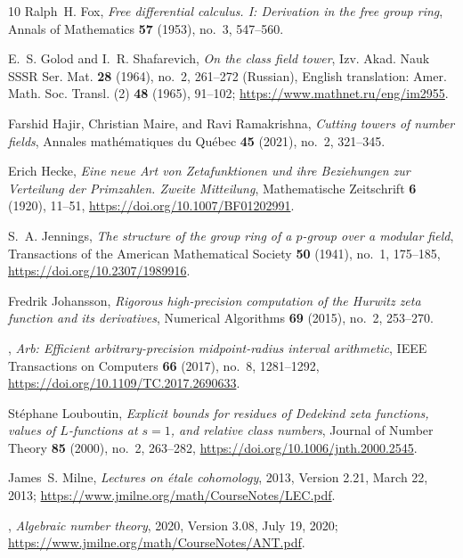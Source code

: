 \documentclass[11pt]{amsart}
\numberwithin{equation}{section}
\theoremstyle{definition}
\theoremstyle{remark}
\begin{document}
\begin{thebibliography}{10}
Ralph~H. Fox, \emph{Free differential calculus. {I}: Derivation in the free
  group ring}, Annals of Mathematics \textbf{57} (1953), no.~3, 547--560.

E.~S. Golod and I.~R. Shafarevich, \emph{On the class field tower}, Izv. Akad.
  Nauk SSSR Ser. Mat. \textbf{28} (1964), no.~2, 261--272 (Russian), English
  translation: Amer. Math. Soc. Transl. (2) \textbf{48} (1965), 91--102;
  \url{https://www.mathnet.ru/eng/im2955}.

Farshid Hajir, Christian Maire, and Ravi Ramakrishna, \emph{Cutting towers of
  number fields}, Annales math{\'e}matiques du Qu{\'e}bec \textbf{45} (2021),
  no.~2, 321--345.

Erich Hecke, \emph{Eine neue {Art} von {Zetafunktionen} und ihre {Beziehungen}
  zur {Verteilung} der {Primzahlen}. {Zweite Mitteilung}}, Mathematische
  Zeitschrift \textbf{6} (1920), 11--51,
  \url{https://doi.org/10.1007/BF01202991}.

S.~A. Jennings, \emph{The structure of the group ring of a {$p$}-group over a
  modular field}, Transactions of the American Mathematical Society \textbf{50}
  (1941), no.~1, 175--185, \url{https://doi.org/10.2307/1989916}.

Fredrik Johansson, \emph{Rigorous high-precision computation of the {Hurwitz}
  zeta function and its derivatives}, Numerical Algorithms \textbf{69} (2015),
  no.~2, 253--270.

\bysame, \emph{{Arb}: Efficient arbitrary-precision midpoint-radius interval
  arithmetic}, IEEE Transactions on Computers \textbf{66} (2017), no.~8,
  1281--1292, \url{https://doi.org/10.1109/TC.2017.2690633}.

St{\'e}phane Louboutin, \emph{Explicit bounds for residues of {Dedekind} zeta
  functions, values of {$L$}-functions at {$s=1$}, and relative class numbers},
  Journal of Number Theory \textbf{85} (2000), no.~2, 263--282,
  \url{https://doi.org/10.1006/jnth.2000.2545}.

James~S. Milne, \emph{Lectures on {\'e}tale cohomology}, 2013, Version 2.21,
  March 22, 2013; \url{https://www.jmilne.org/math/CourseNotes/LEC.pdf}.

\bysame, \emph{Algebraic number theory}, 2020, Version 3.08, July 19, 2020;
  \url{https://www.jmilne.org/math/CourseNotes/ANT.pdf}.


\end{thebibliography}
\end{document}
